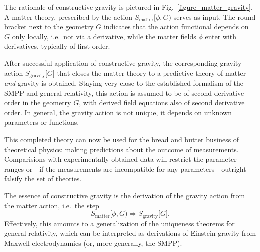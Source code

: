 The rationale of constructive gravity is pictured in Fig.~\ref{figure_matter_gravity}. A matter theory, prescribed by the action $S_\text{matter}\lbrack\phi,G)$ serves as input. The round bracket next to the geometry $G$ indicates that the action functional depends on $G$ only locally, i.e.~not via a derivative, while the matter fields $\phi$ enter with derivatives, typically of first order.

After successful application of constructive gravity, the corresponding gravity action $S_\text{gravity}\lbrack G\rbrack$ that closes the matter theory to a predictive theory of matter \emph{and} gravity is obtained. Staying very close to the established formalism of the SMPP and general relativity, this action is assumed to be of second derivative order in the geometry $G$, with derived field equations also of second derivative order. In general, the gravity action is not unique, it depends on unknown parameters or functions.

This completed theory can now be used for the bread and butter business of theoretical physics: making predictions about the outcome of measurements. Comparisions with experimentally obtained data will restrict the parameter ranges or---if the measurements are incompatible for any parameters---outright falsify the set of theories.

The essence of constructive gravity is the derivation of the gravity action from the matter action, i.e.~the step
\begin{equation*}
  S_\text{matter}\lbrack\phi,G) \Rightarrow S_\text{gravity}\lbrack G\rbrack.
\end{equation*}
Effectively, this amounts to a generalization of the uniqueness theorems for general relativity, which can be interpreted as derivations of Einstein gravity from Maxwell electrodynamics (or, more generally, the SMPP).

